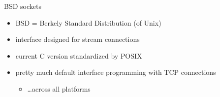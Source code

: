 \begin{frame}{BSD sockets}
    \begin{itemize}
    \item BSD = Berkely Standard Distribution (of Unix)
    \item interface designed for stream connections
    \item current C version standardized by POSIX
    \item pretty much default interface programming with TCP connections
        \begin{itemize}
        \item \ldots across all platforms
        \end{itemize}
    \end{itemize}
\end{frame}
